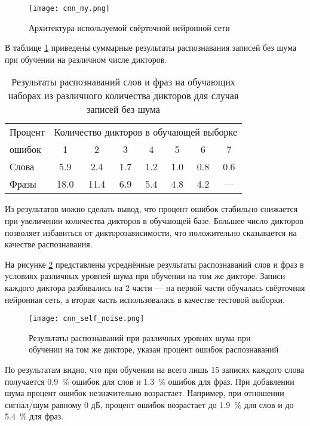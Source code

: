 \begin{figure}[h]
	\centering
	\texttt{[image: cnn\_my.png]}
	\caption{Архитектура используемой свёрточной нейронной сети}
	\label{fig:4_1}
\end{figure}

В таблице \ref{tab:4_1} приведены суммарные результаты распознавания записей без шума при обучении на различном числе дикторов.
\begin{table}[h]
	\centering
	\caption{Результаты распознаваний слов и фраз на обучающих наборах из различного количества дикторов для случая записей без шума}
	\label{tab:4_1}
	\begin{tabular}{| l | c | c | c | c | c | c | c |}
		\hline
		Процент\phantom{0} & \multicolumn{7}{c|}{Количество дикторов в обучающей выборке} \\
		\hhline{~-------}
		ошибок & \phantom{00}1 \phantom{00} & \phantom{00}2 \phantom{00} & \phantom{00}3 \phantom{00} & \phantom{00}4 \phantom{00} & \phantom{00}5 \phantom{00} & \phantom{00}6 \phantom{00} & \phantom{00}7 \phantom{00} \\
		\hline
		Слова		& 5.9 & 2.4 & 1.7 & 1.2 & 1.0 & 0.8 & 0.6 \\
		\hline
		Фразы 		& 18.0 & 11.4 & 6.9 & 5.4 & 4.8 & 4.2 & --- \\
		\hline
	\end{tabular}
\end{table}

Из результатов можно сделать вывод, что процент ошибок стабильно снижается при увеличении количества дикторов в обучающей базе.
Большее число дикторов позволяет избавиться от дикторозависимости, что положительно сказывается на качестве распознавания.

На рисунке \ref{fig:cnn_self_noise} представлены усреднённые результаты распознаваний слов и фраз в условиях различных уровней шума при обучении на том же дикторе.
Записи каждого диктора разбивались на 2 части --- на первой части обучалась свёрточная нейронная сеть, а вторая часть использовалась в качестве тестовой выборки.
\begin{figure}[h]
	\centering
	\texttt{[image: cnn\_self\_noise.png]}
	\caption{Результаты распознаваний при различных уровнях шума при обучении на том же дикторе, указан процент ошибок распознаваний}
	\label{fig:cnn_self_noise}
\end{figure}

По результатам видно, что при обучении на всего лишь 15 записях каждого слова получается 0.9~\% ошибок для слов и 1.3~\% ошибок для фраз.
При добавлении шума процент ошибок незначительно возрастает.
Например, при отношении сигнал/шум равному 0 дБ, процент ошибок возрастает до 1.9~\% для слов и до 5.4~\% для фраз.

